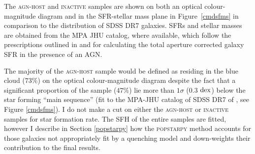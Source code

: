 The \textsc{agn-host} and \textsc{inactive}  samples are shown on both an optical colour-magnitude diagram and in the SFR-stellar mass plane in Figure~\ref{cmdsfms} in comparison to the distribution of SDSS DR7 galaxies. SFRs and stellar masses are obtained from the MPA JHU catalog, where available, which follow the prescriptions outlined in \cite{brinchmann04} and \cite{Salim07} for calculating the total aperture corrected galaxy SFR in the presence of an AGN. 

The majority of the \textsc{agn-host} sample would be defined as residing in the blue cloud ($73\%$) on the optical colour-magnitude diagram despite the fact that a significant proportion of the sample ($47\%$) lie more than $1\sigma$ ($0.3$ $\rm{dex}$) below the star forming ``main sequence'' (fit to the MPA-JHU catalog of SDSS DR7 of \citealt{kauffmann03, brinchmann04}, see Figure \ref{cmdsfms}). I do not make a cut on either the \textsc{agn-host} or \textsc{inactive} samples for star formation rate. The SFH of the entire samples are fitted, however I describe in Section \ref{popstarpy} how the \textsc{popstarpy} method accounts for those galaxies not appropriately fit by a quenching model and down-weights their contribution to the final results.

